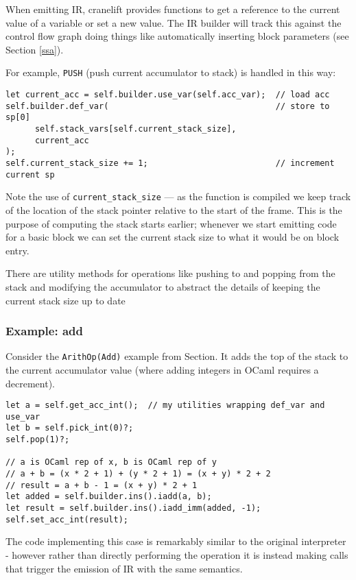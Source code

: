 When emitting IR, cranelift provides functions to get a reference to the current value of a
variable
or set a new value.  The IR builder will track this against the control flow graph doing things
like automatically inserting block parameters (see Section \ref{ssa}).

For example, \texttt{PUSH} (push current accumulator to stack) is handled in this way:

\begin{verbatim}
let current_acc = self.builder.use_var(self.acc_var);  // load acc
self.builder.def_var(                                  // store to sp[0]
      self.stack_vars[self.current_stack_size],
      current_acc
);
self.current_stack_size += 1;                          // increment current sp
\end{verbatim}

Note the use of \texttt{current\_stack\_size} --- as the function is compiled we keep track of the
location of the stack pointer relative to the start of the frame. This is the purpose of computing
the stack starts earlier; whenever we start emitting code for a basic block we can set the current
stack size to what it would be on block entry.

There are utility methods for operations like pushing to and popping from the stack and modifying
the accumulator to abstract the details of keeping the current stack size up to date

\subsubsection{Example: add}

Consider the \texttt{ArithOp(Add)} example from Section. It adds the top of the stack to the
current
accumulator value (where adding integers in OCaml requires a decrement).

\begin{verbatim}
let a = self.get_acc_int();  // my utilities wrapping def_var and use_var
let b = self.pick_int(0)?;
self.pop(1)?;

// a is OCaml rep of x, b is OCaml rep of y
// a + b = (x * 2 + 1) + (y * 2 + 1) = (x + y) * 2 + 2
// result = a + b - 1 = (x + y) * 2 + 1
let added = self.builder.ins().iadd(a, b);
let result = self.builder.ins().iadd_imm(added, -1);
self.set_acc_int(result);
\end{verbatim}

The code implementing this case is remarkably similar to the original interpreter - however rather
than directly performing the operation it is instead making calls that trigger the emission of IR
with the same semantics.

